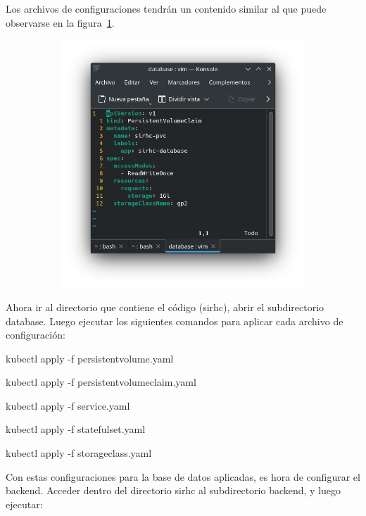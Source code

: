 \documentclass[twoside]{article}
\begin{document}
Los archivos de configuraciones tendrán un contenido similar al que puede observarse en la figura~\ref{fig:configuracionKubernetes}.
\begin{figure}[H]
	\caption{Contenido de un archivo de configuración de kubernetes}
    \begin{subfigure}{1\textwidth}
	\includegraphics[width=1\textwidth]{configuracionKubernetesEjemplo.png}
    \end{subfigure}
	\label{fig:configuracionKubernetes}
\end{figure}
\vspace{-1.0\baselineskip}

Ahora ir al directorio que contiene el código (sirhc), abrir el subdirectorio database. Luego ejecutar los siguientes comandos para aplicar cada archivo de configuración:

kubectl apply -f persistentvolume.yaml

kubectl apply -f persistentvolumeclaim.yaml

kubectl apply -f service.yaml

kubectl apply -f statefulset.yaml

kubectl apply -f storageclass.yaml

Con estas configuraciones para la base de datos aplicadas, es hora de configurar el backend. Acceder dentro del directorio sirhc al subdirectorio backend, y luego ejecutar:
\end{document}
